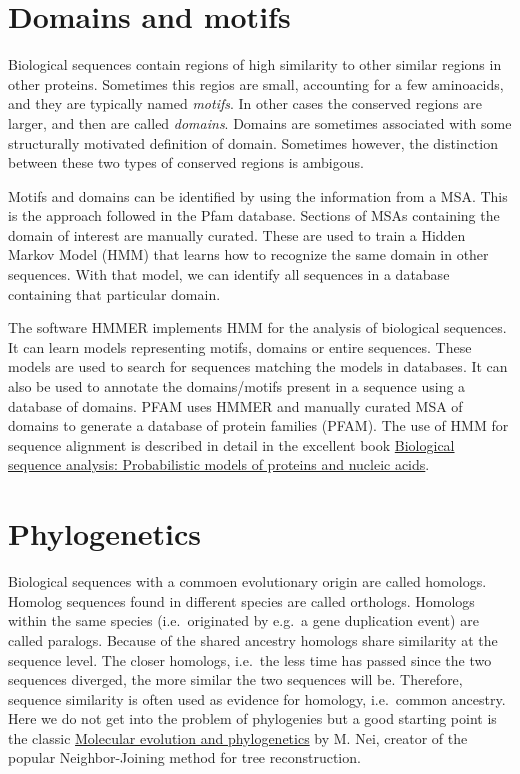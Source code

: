\documentclass[]{book}
\theoremstyle{definition}
\theoremstyle{definition}
\theoremstyle{definition}
\theoremstyle{remark}
\begin{document}
\section{Domains and motifs}\label{domains-and-motifs}

Biological sequences contain regions of high similarity to other similar
regions in other proteins. Sometimes this regios are small, accounting
for a few aminoacids, and they are typically named \emph{motifs}. In
other cases the conserved regions are larger, and then are called
\emph{domains}. Domains are sometimes associated with some structurally
motivated definition of domain. Sometimes however, the distinction
between these two types of conserved regions is ambigous.

Motifs and domains can be identified by using the information from a
MSA. This is the approach followed in the Pfam database. Sections of
MSAs containing the domain of interest are manually curated. These are
used to train a Hidden Markov Model (HMM) that learns how to recognize
the same domain in other sequences. With that model, we can identify all
sequences in a database containing that particular domain.

The software HMMER implements HMM for the analysis of biological
sequences. It can learn models representing motifs, domains or entire
sequences. These models are used to search for sequences matching the
models in databases. It can also be used to annotate the domains/motifs
present in a sequence using a database of domains. PFAM uses HMMER and
manually curated MSA of domains to generate a database of protein
families (PFAM). The use of HMM for sequence alignment is described in
detail in the excellent book
\protect\hyperlink{biological-sequence-analysis-probabilistic-models-of-proteins-and-nucleic-acids}{Biological
sequence analysis: Probabilistic models of proteins and nucleic acids}.

\section{Phylogenetics}\label{phylogenetics}

Biological sequences with a commoen evolutionary origin are called
homologs. Homolog sequences found in different species are called
orthologs. Homologs within the same species (i.e.~originated by e.g.~a
gene duplication event) are called paralogs. Because of the shared
ancestry homologs share similarity at the sequence level. The closer
homologs, i.e.~the less time has passed since the two sequences
diverged, the more similar the two sequences will be. Therefore,
sequence similarity is often used as evidence for homology, i.e.~common
ancestry. Here we do not get into the problem of phylogenies but a good
starting point is the classic
\protect\hyperlink{molecular-evolution-and-phylogenetics}{Molecular
evolution and phylogenetics} by M. Nei, creator of the popular
Neighbor-Joining method for tree reconstruction.
\end{document}
